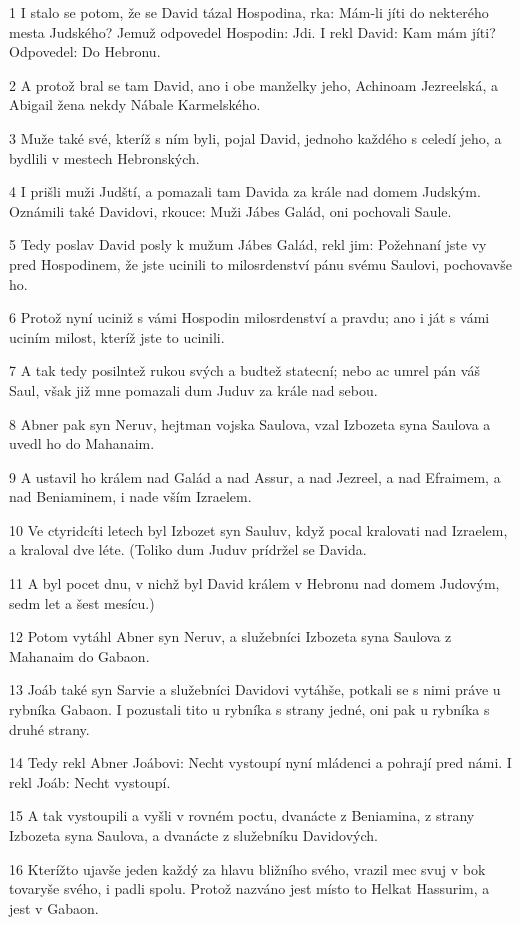 \par 1 I stalo se potom, že se David tázal Hospodina, rka: Mám-li jíti do nekterého mesta Judského? Jemuž odpovedel Hospodin: Jdi. I rekl David: Kam mám jíti? Odpovedel: Do Hebronu.
\par 2 A protož bral se tam David, ano i obe manželky jeho, Achinoam Jezreelská, a Abigail žena nekdy Nábale Karmelského.
\par 3 Muže také své, kteríž s ním byli, pojal David, jednoho každého s celedí jeho, a bydlili v mestech Hebronských.
\par 4 I prišli muži Judští, a pomazali tam Davida za krále nad domem Judským. Oznámili také Davidovi, rkouce: Muži Jábes Galád, oni pochovali Saule.
\par 5 Tedy poslav David posly k mužum Jábes Galád, rekl jim: Požehnaní jste vy pred Hospodinem, že jste ucinili to milosrdenství pánu svému Saulovi, pochovavše ho.
\par 6 Protož nyní uciniž s vámi Hospodin milosrdenství a pravdu; ano i ját s vámi uciním milost, kteríž jste to ucinili.
\par 7 A tak tedy posilntež rukou svých a budtež statecní; nebo ac umrel pán váš Saul, však již mne pomazali dum Juduv za krále nad sebou.
\par 8 Abner pak syn Neruv, hejtman vojska Saulova, vzal Izbozeta syna Saulova a uvedl ho do Mahanaim.
\par 9 A ustavil ho králem nad Galád a nad Assur, a nad Jezreel, a nad Efraimem, a nad Beniaminem, i nade vším Izraelem.
\par 10 Ve ctyridcíti letech byl Izbozet syn Sauluv, když pocal kralovati nad Izraelem, a kraloval dve léte. (Toliko dum Juduv prídržel se Davida.
\par 11 A byl pocet dnu, v nichž byl David králem v Hebronu nad domem Judovým, sedm let a šest mesícu.)
\par 12 Potom vytáhl Abner syn Neruv, a služebníci Izbozeta syna Saulova z Mahanaim do Gabaon.
\par 13 Joáb také syn Sarvie a služebníci Davidovi vytáhše, potkali se s nimi práve u rybníka Gabaon. I pozustali tito u rybníka s strany jedné, oni pak u rybníka s druhé strany.
\par 14 Tedy rekl Abner Joábovi: Necht vystoupí nyní mládenci a pohrají pred námi. I rekl Joáb: Necht vystoupí.
\par 15 A tak vystoupili a vyšli v rovném poctu, dvanácte z Beniamina, z strany Izbozeta syna Saulova, a dvanácte z služebníku Davidových.
\par 16 Kterížto ujavše jeden každý za hlavu bližního svého, vrazil mec svuj v bok tovaryše svého, i padli spolu. Protož nazváno jest místo to Helkat Hassurim, a jest v Gabaon.

